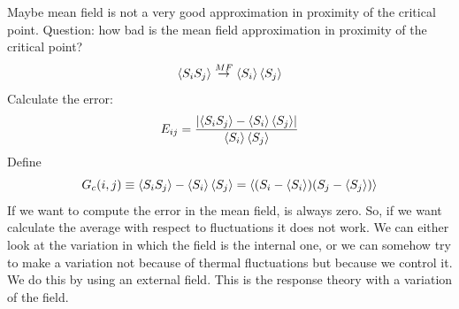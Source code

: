 \documentclass[../main/main.tex]{subfiles}
\begin{document}
Maybe mean field is not a very good approximation in proximity of the critical point. Question: how bad is the mean field approximation in proximity of the critical point?
\begin{equation}
  \expval{S_i S_j} \overset{MF}{\rightarrow } \expval{S_i} \expval{S_j}
\end{equation}
Calculate the error:
\begin{equation}
  E_{ij} = \frac{ \abs{\expval{S_i S_j}  - \expval{S_i} \expval{S_j}}   }{\expval{S_i}\expval{S_j}  }
\end{equation}
Define
\begin{equation}
  G_c (i,j) \equiv \expval{S_i S_j} - \expval{S_i} \expval{S_j} = \expval{(S_i -\expval{S_i} )(S_j - \expval{S_j} )}
\end{equation}
If we want to compute the error in the mean field, is always zero. So, if we want calculate the average with respect to fluctuations it does not work. We can either look at the variation in which the field is the internal one, or we can somehow try to make a variation not because of thermal fluctuations but because we control it. We do this by using an external field. This is the response theory with a variation of the field.
\end{document}
